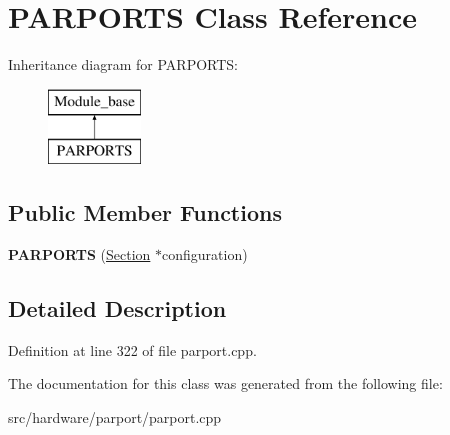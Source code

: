 \hypertarget{classPARPORTS}{\section{P\-A\-R\-P\-O\-R\-T\-S Class Reference}
\label{classPARPORTS}
}
Inheritance diagram for P\-A\-R\-P\-O\-R\-T\-S\-:\begin{figure}[H]
\begin{center}
\leavevmode
\includegraphics[height=2.000000cm]{classPARPORTS}
\end{center}
\end{figure}
\subsection*{Public Member Functions}
\begin{DoxyCompactItemize}
\item 
\hypertarget{classPARPORTS_ae31b01031b124375887e40c08d13351e}{{\bfseries P\-A\-R\-P\-O\-R\-T\-S} (\hyperlink{classSection}{Section} $\ast$configuration)}\label{classPARPORTS_ae31b01031b124375887e40c08d13351e}

\end{DoxyCompactItemize}


\subsection{Detailed Description}


Definition at line 322 of file parport.\-cpp.



The documentation for this class was generated from the following file\-:\begin{DoxyCompactItemize}
\item 
src/hardware/parport/parport.\-cpp\end{DoxyCompactItemize}
